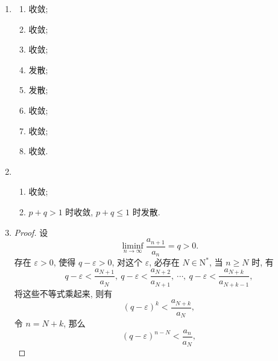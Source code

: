 % 
\begin{enumerate}
    \item %
        \begin{multicols}{4}
            \begin{enumerate}[(1)]
                \item %
                    收敛;
                \item %
                    收敛;
                \item %
                    收敛;
                \item %
                    发散;
                \item %
                    发散;
                \item %
                    收敛;
                \item %
                    收敛;
                \item %
                    收敛.
            \end{enumerate}
        \end{multicols}
    \item %
        \begin{enumerate}[(1)]
            \item %
                收敛;
            \item %
                $p + q > 1$ 时收敛, $p + q \leq 1$ 时发散.
        \end{enumerate}
    \item %
        \begin{proof}
            设
            \[
                \liminf_{n\to\infty}\frac{a_{n+1}}{a_n} = q > 0.    
            \]
            存在 $\varepsilon > 0$, 使得 $q - \varepsilon > 0$, 对这个 $\varepsilon$, 必存在 $N \in \mathrm{N}^*$, 当 $n \geq N$ 时, 有
            \[
                q - \varepsilon < \frac{a_{N+1}}{a_N},\ q - \varepsilon < \frac{a_{N+2}}{a_{N+1}},\ \cdots,\ q - \varepsilon < \frac{a_{N+k}}{a_{N+k-1}},    
            \]
            将这些不等式乘起来, 则有
            \[
                (q - \varepsilon)^k < \frac{a_{N+k}}{a_N},    
            \]
            令 $n = N+k$, 那么
            \[
                (q - \varepsilon)^{n-N} < \frac{a_n}{a_N},    
\]
\end{proof}
\end{enumerate}

